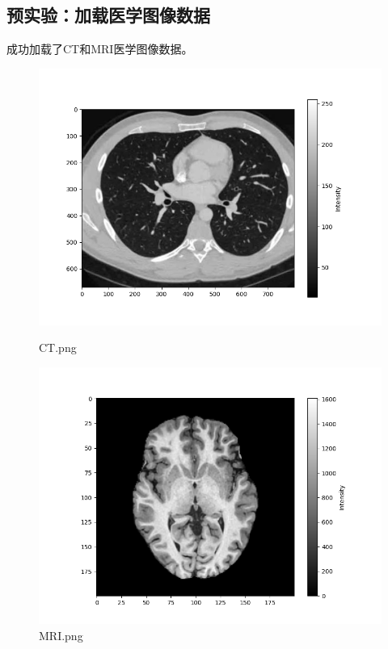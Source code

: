 \documentclass[10.5pt]{config}
\begin{document}
\subsection{预实验：加载医学图像数据}
成功加载了CT和MRI医学图像数据。
\begin{figure}[!htbp]
    \centering
    \begin{minipage}[b]{0.45\linewidth}
        \centering
        \includegraphics[width=1.0\textwidth]{figures/CT.png}
        \caption{CT.png}
    \end{minipage}%
    \begin{minipage}[b]{0.45\linewidth}
        \centering
        \includegraphics[width=1.0\textwidth]{figures/MRI.png}
        \caption{MRI.png}
    \end{minipage}
\end{figure}
\end{document}
